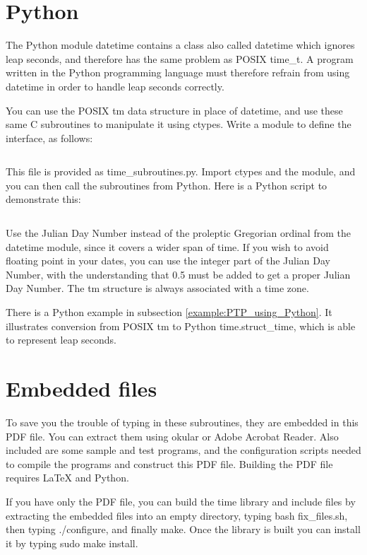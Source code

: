 \documentclass[letterpaper,twoside]{article}
\begin{document}
\section{Python}
The Python module datetime contains a class also called datetime
which ignores leap seconds, and therefore has the same problem
as POSIX {\ttfamily time\_t}.  A program written in the Python
programming language must therefore refrain from using datetime
in order to handle leap seconds correctly.

You can use the POSIX {\ttfamily tm} data structure in place of datetime,
and use these same C subroutines to manipulate it using
{\ttfamily ctypes}.
Write a module to define the interface, as follows:
\inputminted[firstline=28,lastline=373]{Python}{time_subroutines.py}
This file is provided as {\ttfamily time\_subroutines.py}.
Import ctypes and the module, and you can then call the subroutines
from Python.  Here is a Python script to demonstrate this:
\inputminted[firstline=27,lastline=98]{Python}{tests/demo_python.py}

Use the Julian Day Number instead of the proleptic Gregorian ordinal
from the datetime module, since it covers a wider span of time.
If you wish to avoid floating point in your dates, you can use
the integer part of the Julian Day Number, with the understanding
that \num{0.5} must be added to get a proper Julian Day Number.
The {\ttfamily tm} structure is always associated with a time zone.

There is a Python example in subsection \ref{example:PTP_using_Python}.
It illustrates conversion from POSIX {\ttfamily tm} to
Python {\ttfamily time.struct\_time}, which is able to represent leap seconds.

\section{Embedded files}
\label{section:Embedded_files}
To save you the trouble of typing in these subroutines, they are embedded
in this PDF file.  You can extract them using okular or Adobe Acrobat Reader.
Also included are some sample and test programs, and the configuration
scripts needed to compile the programs and construct this PDF file.
Building the PDF file requires {\LaTeX} and Python.

If you have only the PDF file, you can build the time library
and include files by
extracting the embedded files into an empty directory,
typing {\ttfamily bash fix\_files.sh}, 
then typing {\ttfamily ./configure},
and finally {\ttfamily make}.
Once the library is built you can install it by typing
{\ttfamily sudo make install}.
\end{document}
